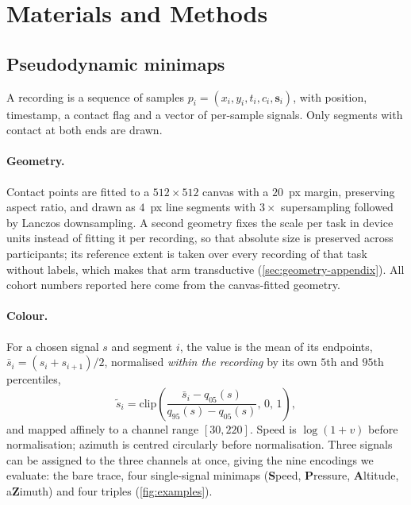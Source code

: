 \documentclass[10pt,a4paper]{article}
\begin{document}
\section{Materials and Methods}
\label{sec:methods}


\subsection{Pseudodynamic minimaps}
\label{sec:method}


A recording is a sequence of samples $p_i = (x_i, y_i, t_i, c_i, \mathbf{s}_i)$, with position,
timestamp, a contact flag and a vector of per-sample signals. Only segments with contact at both
ends are drawn.

\paragraph{Geometry.} Contact points are fitted to a $512 \times 512$ canvas with a $20$~px margin,
preserving aspect ratio, and drawn as $4$~px line segments with $3\times$ supersampling followed by
Lanczos downsampling. A second geometry fixes the scale per task in device units instead of fitting
it per recording, so that absolute size is preserved across participants; its reference extent is
taken over every recording of that task without labels, which makes that arm transductive
(\cref{sec:geometry-appendix}). All cohort numbers reported here come from the canvas-fitted
geometry.

\paragraph{Colour.} For a chosen signal $s$ and segment $i$, the value is the mean of its endpoints,
$\bar{s}_i = (s_i + s_{i+1})/2$, normalised \emph{within the recording} by its own $5$th and $95$th
percentiles,
\begin{equation}
\tilde{s}_i = \mathrm{clip}\!\left(\frac{\bar{s}_i - q_{05}(s)}{q_{95}(s) - q_{05}(s)},\, 0,\, 1\right),
\end{equation}
and mapped affinely to a channel range $[30, 220]$. Speed is $\log(1+v)$ before normalisation;
azimuth is centred circularly before normalisation. Three signals can be assigned to the three
channels at once, giving the nine encodings we evaluate: the bare trace, four single-signal
minimaps (\textbf{S}peed, \textbf{P}ressure, \textbf{A}ltitude, a\textbf{Z}imuth) and four
triples (\cref{fig:examples}).
\end{document}
